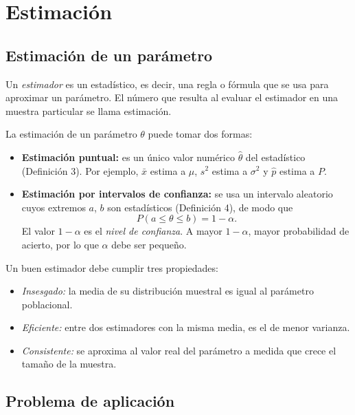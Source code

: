 \documentclass[10pt,letterpaper]{article}
\begin{document}


\newpage
\tableofcontents
\thispagestyle{plain}
\clearpage

\section{Estimación}

\subsection{Estimación de un parámetro}

Un \textit{estimador} es un estadístico, es decir, una regla o fórmula que se usa para aproximar un parámetro. El número que resulta al evaluar el estimador en una muestra particular se llama estimación.

La estimación de un parámetro $\theta$ puede tomar dos formas:
\begin{itemize}
    \item \textbf{Estimación puntual:} es un único valor numérico $\hat{\theta}$ del estadístico (Definición 3). Por ejemplo, $\bar{x}$ estima a $\mu$, $s^2$ estima a $\sigma^2$ y $\hat{p}$ estima a $P$.
    \item \textbf{Estimación por intervalos de confianza:} se usa un intervalo aleatorio cuyos extremos $a$, $b$ son estadísticos (Definición 4), de modo que
    \[
        P(a \le \theta \le b) = 1-\alpha .
    \]
    El valor $1-\alpha$ es el \textit{nivel de confianza}. A mayor $1-\alpha$, mayor probabilidad de acierto, por lo que $\alpha$ debe ser pequeño.
\end{itemize}

Un buen estimador debe cumplir tres propiedades:
\begin{itemize}
    \item \textit{Insesgado:} la media de su distribución muestral es igual al parámetro poblacional.
    \item \textit{Eficiente:} entre dos estimadores con la misma media, es el de menor varianza.
    \item \textit{Consistente:} se aproxima al valor real del parámetro a medida que crece el tamaño de la muestra.
\end{itemize}

\subsection{Problema de aplicación}
\end{document}
